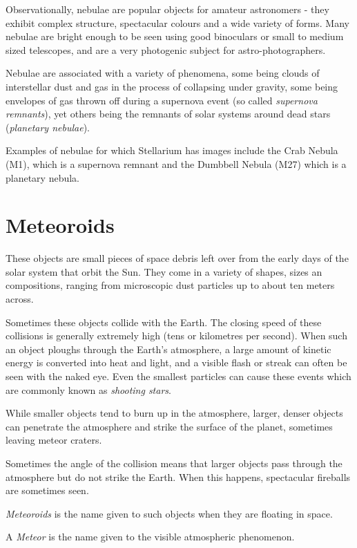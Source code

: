 Observationally, nebulae are popular objects for amateur astronomers -
they exhibit complex structure, spectacular colours and a wide variety
of forms. Many nebulae are bright enough to be seen using good
binoculars or small to medium sized telescopes, and are a very
photogenic subject for astro-photographers.

Nebulae are associated with a variety of phenomena, some being clouds of
interstellar dust and gas in the process of collapsing under gravity,
some being envelopes of gas thrown off during a supernova event (so
called \emph{supernova remnants}), yet others being the remnants of
solar systems around dead stars (\emph{planetary nebulae}).

Examples of nebulae for which Stellarium has images include the Crab
Nebula (M1), which is a supernova remnant and the Dumbbell Nebula (M27)
which is a planetary nebula.

\section{Meteoroids}\label{meteoroids}

These objects are small pieces of space debris left over from the early
days of the solar system that orbit the Sun. They come in a variety of
shapes, sizes an compositions, ranging from microscopic dust particles
up to about ten meters across.

Sometimes these objects collide with the Earth. The closing speed of
these collisions is generally extremely high (tens or kilometres per
second). When such an object ploughs through the Earth's atmosphere, a
large amount of kinetic energy is converted into heat and light, and a
visible flash or streak can often be seen with the naked eye. Even the
smallest particles can cause these events which are commonly known as
\emph{shooting stars}.

While smaller objects tend to burn up in the atmosphere, larger, denser
objects can penetrate the atmosphere and strike the surface of the
planet, sometimes leaving meteor craters.

Sometimes the angle of the collision means that larger objects pass
through the atmosphere but do not strike the Earth. When this happens,
spectacular fireballs are sometimes seen.

\emph{Meteoroids} is the name given to such objects when they are
floating in space.

A \emph{Meteor} is the name given to the visible atmospheric phenomenon.

